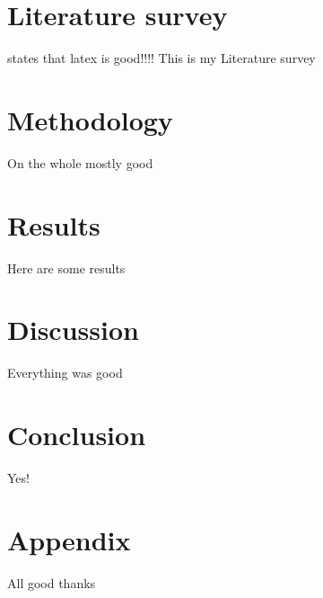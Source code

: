 \documentclass[12pt,a4paper]{article}
\begin{document}
\section{Literature survey}

 \cite[p33]{latex:guide} states that latex is good!!!!
This is my Literature survey

\section{Methodology}

On the whole mostly good 

\section{Results}

Here are some results 

\section{Discussion}

Everything was good

\section{Conclusion}

Yes!

\section{Appendix}

All good thanks


\end{document}
